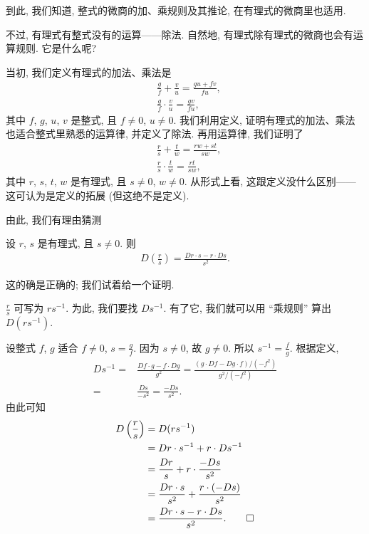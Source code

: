 到此, 我们知道, 整式的微商的加、乘规则及其推论, 在有理式的微商里也适用.

不过, 有理式有整式没有的运算——除法. 自然地, 有理式除有理式的微商也会有运算规则. 它是什么呢?

当初, 我们定义有理式的加法、乘法是
\begin{align*}
     & \frac{g}{f} + \frac{v}{u} = \frac{gu + fv}{fu}, \\
     & \frac{g}{f} \cdot \frac{v}{u} = \frac{gv}{fu},
\end{align*}
其中 $f$, $g$, $u$, $v$ 是整式, 且 $f \neq 0$, $u \neq 0$. 我们利用定义, 证明有理式的加法、乘法也适合整式里熟悉的运算律, 并定义了除法. 再用运算律, 我们证明了
\begin{align*}
     & \frac{r}{s} + \frac{t}{w} = \frac{rw + st}{sw}, \\
     & \frac{r}{s} \cdot \frac{t}{w} = \frac{rt}{sw},
\end{align*}
其中 $r$, $s$, $t$, $w$ 是有理式, 且 $s \neq 0$, $w \neq 0$. 从形式上看, 这跟定义没什么区别——这可认为是定义的拓展 (但这绝不是定义).

由此, 我们有理由猜测
\begin{proposition}
    设 $r$, $s$ 是有理式, 且 $s \neq 0$. 则
    \begin{align*}
        D \left( \frac{r}{s} \right) = \frac{Dr \cdot s - r \cdot Ds}{s^2}.
    \end{align*}
\end{proposition}

这的确是正确的; 我们试着给一个证明.
\begin{pf}
    $\frac{r}{s}$ 可写为 $rs^{-1}$. 为此, 我们要找 $Ds^{-1}$. 有了它, 我们就可以用 ``乘规则'' 算出 $D(rs^{-1})$.

    设整式 $f$, $g$ 适合 $f \neq 0$, $s = \frac{g}{f}$. 因为 $s \neq 0$, 故 $g \neq 0$. 所以 $s^{-1} = \frac{f}{g}$. 根据定义,
    \begin{align*}
        Ds^{-1}
        = {} & \frac{Df \cdot g - f \cdot Dg}{g^2} = \frac{(g \cdot Df - Dg \cdot f)/(-f^2)}{g^2/(-f^2)} \\
        = {} & \frac{Ds}{-s^2} = \frac{-Ds}{s^2}.
    \end{align*}
    由此可知
    \begin{align*}
        D \left( \frac{r}{s} \right)
        = {} & D(rs^{-1})                                         \\
        = {} & Dr \cdot s^{-1} + r \cdot Ds^{-1}                  \\
        = {} & \frac{Dr}{s} + r \cdot \frac{-Ds}{s^2}             \\
        = {} & \frac{Dr \cdot s}{s^2} + \frac{r \cdot (-Ds)}{s^2} \\
        = {} & \frac{Dr \cdot s - r \cdot Ds}{s^2}. \qedhere
    \end{align*}
\end{pf}

